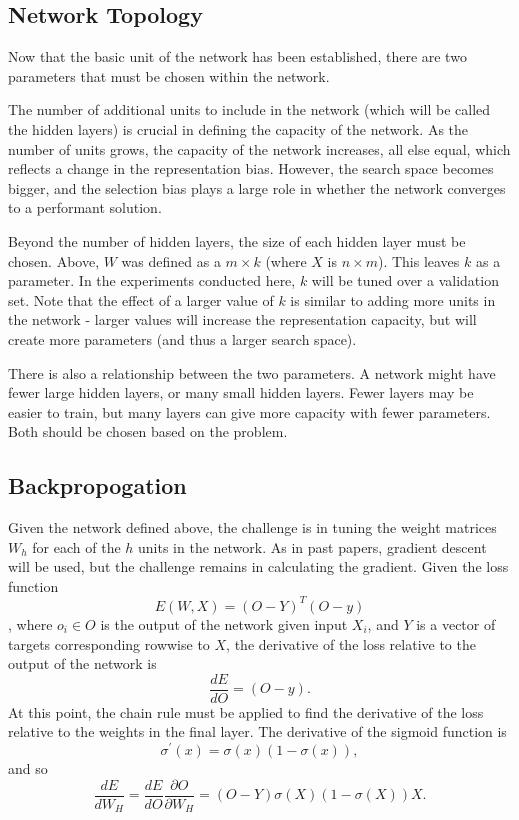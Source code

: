 \documentclass{amsart}
\begin{document}
    \subsection*{Network Topology}
    Now that the basic unit of the network has been established, there
    are two parameters that must be chosen within the network.

    The number of additional units to include in the network (which will be
    called the hidden layers) is crucial in defining the capacity of the
    network. As the number of units grows, the capacity of the
    network increases, all else equal, which reflects a change in the
    representation bias. However, the search space becomes bigger,
    and the selection bias plays a large role in whether the network
    converges to a performant solution.

    Beyond the number of hidden layers, the size of each
    hidden layer must be chosen.
    Above, $W$ was defined as a $m \times k$ (where $X$ is $n \times m$).
    This leaves $k$ as a parameter. In the experiments conducted here,
    $k$ will be tuned over a validation set.
    Note that the effect of a larger value of $k$ is similar to adding more
    units in the network - larger values will increase the representation
    capacity, but will create more parameters (and thus a larger search space).

    There is also a relationship between the two parameters. A network
    might have fewer large hidden layers, or many small hidden layers.
    Fewer layers may be easier to train, but many layers can give more capacity
    with fewer parameters. Both should be chosen based on the problem.

    \subsection*{Backpropogation}
    Given the network defined above, the challenge is in tuning
    the weight matrices $W_h$ for each of the $h$ units in
    the network. As in past papers, gradient descent will be
    used, but the challenge remains in calculating the gradient.
    Given the loss function
    \[
        E(W, X) = (O - Y)^T (O - y)
    \],
    where $o_i \in O$
    is the output of the network given input $X_i$, and $Y$
    is a vector of targets corresponding rowwise to $X$,
    the derivative of the loss relative to the output of the
    network is
    \[
        \frac{dE}{dO} = (O - y).
    \]
    At this point, the chain rule must be
    applied to find the derivative of the loss relative
    to the weights in the final layer.
    The derivative of the sigmoid function is
    \[
        \sigma^\prime (x) = \sigma(x) (1 - \sigma(x)),
    \]
    and so \[
        \frac{dE}{dW_H} =
        \frac{dE}{dO} \frac{\partial O}{\partial W_H} =
        (O - Y) \sigma(X) (1 - \sigma(X)) X.
    \]
\end{document}
